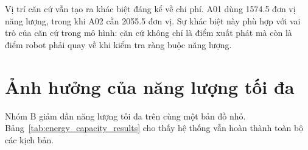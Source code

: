\documentclass[../DoAn.tex]{subfiles}
\begin{document}
\begin{table}[H]
\centering
\caption{Kết quả nhóm A khi thay đổi vị trí căn cứ}
\label{tab:base_position_results}
\scriptsize
\setlength{\tabcolsep}{3.5pt}
\renewcommand{\arraystretch}{1.08}
\end{table}

Vị trí căn cứ vẫn tạo ra khác biệt đáng kể về chi phí. A01 dùng 1574.5 đơn vị năng lượng, trong khi A02 cần 2055.5 đơn vị. Sự khác biệt này phù hợp với vai trò của căn cứ trong mô hình: căn cứ không chỉ là điểm xuất phát mà còn là điểm robot phải quay về khi kiểm tra ràng buộc năng lượng.

\section{Ảnh hưởng của năng lượng tối đa}

Nhóm B giảm dần năng lượng tối đa trên cùng một bản đồ nhỏ. Bảng~\ref{tab:energy_capacity_results} cho thấy hệ thống vẫn hoàn thành toàn bộ các kịch bản.
\end{document}
